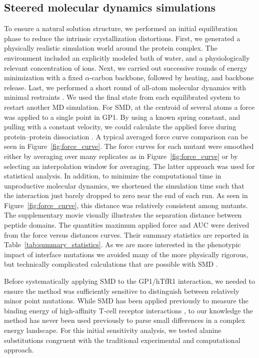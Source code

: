 \documentclass[12pt]{article}
\begin{document}
\subsection*{Steered molecular dynamics simulations}
To ensure a natural solution structure, we performed an initial equilibration phase to reduce the intrinsic crystallization distortions. First, we generated a physically realistic simulation world around the protein complex. The environment included an explicitly modeled bath of water, and a physiologically relevant concentration of ions. Next, we carried out successive rounds of energy minimization with a fixed $\alpha$-carbon backbone, followed by heating, and backbone release. Last, we performed a short round of all-atom molecular dynamics with minimal restraints \citep{Cuendet2008}. We used the final state from each equilibrated system to restart another MD simulation. For SMD, at the centroid of several atoms a force was applied to a single point in GP1. By using a known spring constant, and pulling with a constant velocity, we could calculate the applied force during protein--protein dissociation \citep{Cuendet2008,Cuendet2011}. A typical averaged force curve comparison can be seen in Figure~\ref{fig:force_curve}. The force curves for each mutant were smoothed either by averaging over many replicates as in Figure~\ref{fig:force_curve} or by selecting an interpolation window for averaging. The latter approach was used for statistical analysis. In addition, to minimize the computational time in unproductive molecular dynamics, we shortened the simulation time such that the interaction just barely dropped to zero near the end of each run. As seen in Figure~\ref{fig:force_curve}, this distance was relatively consistent among mutants. The supplementary movie visually illustrates the separation distance between peptide domains. The quantities maximum applied force and AUC were derived from the force versus distances curves. Their summary statistics are reported in Table~\ref{tab:summary_statistics}. As we are more interested in the phenotypic impact of interface mutations we avoided many of the more physically rigorous, but technically complicated calculations that are possible with SMD \citep{Is2001A,Is2001B}.

Before systematically applying SMD to the GP1/hTfR1 interaction, we needed to ensure the method was sufficiently sensitive to distinguish between relatively minor point mutations. While SMD has been applied previously to measure the binding energy of high-affinity T-cell receptor interactions \citep{Cuendet2008,Cuendet2011}, to our knowledge the method has never been used previously to parse small differences in a complex energy landscape. For this initial sensitivity analysis, we tested alanine substitutions congruent with the traditional experimental and computational approach. 
\end{document}
